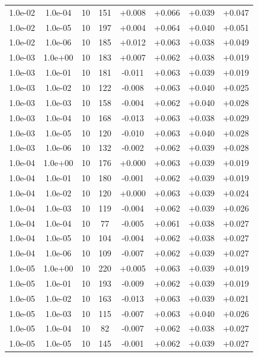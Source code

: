 \documentclass[11pt,a4paper]{article}
\begin{document}
\begin{table}
{\begin{tabular}{*{8}c}
 1.0e-02 	 & 1.0e-04 	 & 10 & 151 	 & +0.008 & +0.066 & +0.039 & +0.047 \\ 
 1.0e-02 	 & 1.0e-05 	 & 10 & 197 	 & +0.004 & +0.064 & +0.040 & +0.051 \\ 
 1.0e-02 	 & 1.0e-06 	 & 10 & 185 	 & +0.012 & +0.063 & +0.038 & +0.049 \\ 
 1.0e-03 	 & 1.0e+00 	 & 10 & 183 	 & +0.007 & +0.062 & +0.038 & +0.019 \\ 
 1.0e-03 	 & 1.0e-01 	 & 10 & 181 	 & -0.011 & +0.063 & +0.039 & +0.019 \\ 
 1.0e-03 	 & 1.0e-02 	 & 10 & 122 	 & -0.008 & +0.063 & +0.040 & +0.025 \\ 
 1.0e-03 	 & 1.0e-03 	 & 10 & 158 	 & -0.004 & +0.062 & +0.040 & +0.028 \\ 
 1.0e-03 	 & 1.0e-04 	 & 10 & 168 	 & -0.013 & +0.063 & +0.038 & +0.029 \\ 
 1.0e-03 	 & 1.0e-05 	 & 10 & 120 	 & -0.010 & +0.063 & +0.040 & +0.028 \\ 
 1.0e-03 	 & 1.0e-06 	 & 10 & 132 	 & -0.002 & +0.062 & +0.039 & +0.028 \\ 
 1.0e-04 	 & 1.0e+00 	 & 10 & 176 	 & +0.000 & +0.063 & +0.039 & +0.019 \\ 
 1.0e-04 	 & 1.0e-01 	 & 10 & 180 	 & -0.001 & +0.062 & +0.039 & +0.019 \\ 
 1.0e-04 	 & 1.0e-02 	 & 10 & 120 	 & +0.000 & +0.063 & +0.039 & +0.024 \\ 
 1.0e-04 	 & 1.0e-03 	 & 10 & 119 	 & -0.004 & +0.062 & +0.039 & +0.026 \\ 
 1.0e-04 	 & 1.0e-04 	 & 10 & 77 	 & -0.005 & +0.061 & +0.038 & +0.027 \\ 
 1.0e-04 	 & 1.0e-05 	 & 10 & 104 	 & -0.004 & +0.062 & +0.038 & +0.027 \\ 
 1.0e-04 	 & 1.0e-06 	 & 10 & 109 	 & -0.007 & +0.062 & +0.039 & +0.027 \\ 
 1.0e-05 	 & 1.0e+00 	 & 10 & 220 	 & +0.005 & +0.063 & +0.039 & +0.019 \\ 
 1.0e-05 	 & 1.0e-01 	 & 10 & 193 	 & -0.009 & +0.062 & +0.039 & +0.019 \\ 
 1.0e-05 	 & 1.0e-02 	 & 10 & 163 	 & -0.013 & +0.063 & +0.039 & +0.021 \\ 
 1.0e-05 	 & 1.0e-03 	 & 10 & 115 	 & -0.007 & +0.063 & +0.040 & +0.026 \\ 
 1.0e-05 	 & 1.0e-04 	 & 10 & 82 	 & -0.007 & +0.062 & +0.038 & +0.027 \\ 
 1.0e-05 	 & 1.0e-05 	 & 10 & 145 	 & -0.001 & +0.062 & +0.039 & +0.027 \\ 

\end{tabular}}
\end{table}
\end{document}
